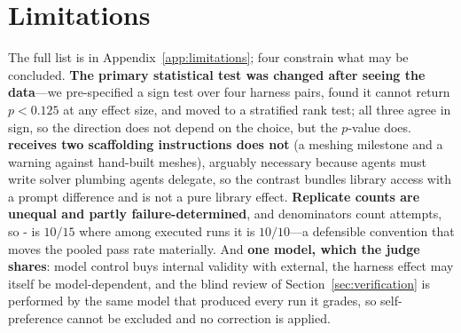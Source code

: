 \section{Limitations}
\label{sec:limitations}

The full list is in Appendix~\ref{app:limitations}; four constrain what may be
concluded. \textbf{The primary statistical test was changed after seeing the
data}---we pre-specified a sign test over four harness pairs, found it cannot
return $p < 0.125$ at any effect size, and moved to a stratified rank test; all
three agree in sign, so the direction does not depend on the choice, but the
$p$-value does. \textbf{\Lthree{} receives two
scaffolding instructions \Ltwo{} does not} (a meshing milestone and a warning
against hand-built meshes), arguably necessary because \Lthree{} agents must
write solver plumbing \Ltwo{} agents delegate, so the contrast bundles library
access with a prompt difference and is not a pure library effect.
\textbf{Replicate counts are unequal and partly failure-determined}, and
denominators count attempts, so \Ltwo{}- is $10/15$ where among
executed runs it is $10/10$---a defensible convention that moves the pooled
\Ltwo{} pass rate materially. And \textbf{one model, which the judge shares}:
model control buys internal validity with external, the harness effect may
itself be model-dependent, and the blind review of Section~\ref{sec:verification}
is performed by the same model that produced every run it grades, so
self-preference cannot be excluded and no correction is applied.

